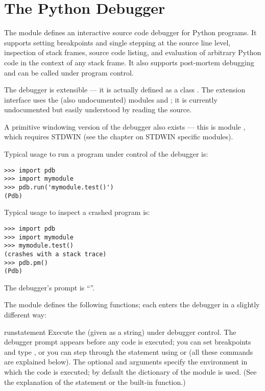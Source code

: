 \chapter{The Python Debugger}

\renewcommand{\indexsubitem}{(in module pdb)}

The module  defines an interactive source code debugger for
Python programs.  It supports setting breakpoints and single stepping
at the source line level, inspection of stack frames, source code
listing, and evaluation of arbitrary Python code in the context of any
stack frame.  It also supports post-mortem debugging and can be called
under program control.

The debugger is extensible --- it is actually defined as a class
.  The extension interface uses the (also undocumented)
modules  and ; it is currently undocumented but
easily understood by reading the source.

A primitive windowing version of the debugger also exists --- this is
module , which requires STDWIN (see the chapter on STDWIN
specific modules).

Typical usage to run a program under control of the debugger is:

\begin{verbatim}
>>> import pdb
>>> import mymodule
>>> pdb.run('mymodule.test()')
(Pdb)
\end{verbatim}

Typical usage to inspect a crashed program is:

\begin{verbatim}
>>> import pdb
>>> import mymodule
>>> mymodule.test()
(crashes with a stack trace)
>>> pdb.pm()
(Pdb)
\end{verbatim}

The debugger's prompt is ``''.

The module defines the following functions; each enters the debugger
in a slightly different way:

\begin{funcdesc}{run}{statement}
Execute the  (given as a string) under debugger
control.  The debugger prompt appears before any code is executed; you
can set breakpoints and type , or you can step through
the statement using  or  (all these commands are
explained below).  The optional  and 
arguments specify the environment in which the code is executed; by
default the dictionary of the module  is used.  (See
the explanation of the  statement or the 
built-in function.)
\end{funcdesc}

